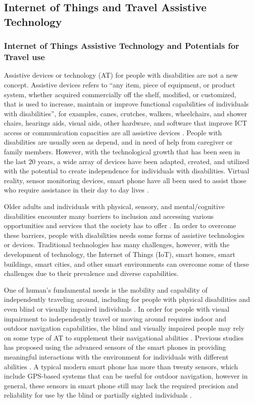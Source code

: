 \subsection{Internet of Things and Travel Assistive Technology}
\subsubsection{Internet of Things Assistive Technology and Potentials for Travel use}
Assistive devices or technology (AT) for people with disabilities are not a new concept. 
Assistive devices refers to ``any item, piece of equipment, or product system, 
whether acquired commercially off the shelf, modified, or customized, that is used 
to increase, maintain or improve functional capabilities of individuals with 
disabilities'', for examples, canes, crutches, walkers, wheelchairs, and shower 
chairs, hearings aids, visual aids, other hardware, and software that improve 
ICT access or communication capacities are all assistive devices \cite{Barbeau, Shah}. 
People with disabilities are usually seen as depend, and in need of help from
caregiver or family members. However, with the technological growth that has 
been seen in the last 20 years, a wide array of devices have been adapted, 
created, and utilized with the potential to create independence for individuals 
with disabilities. Virtual reality, sensor monitoring devices, smart phone have 
all been used to assist those who require assistance in their day to day 
lives \cite{moya2016dynamic}.  

Older adults and individuals with physical, sensory, and mental/cognitive 
disabilities encounter many barriers to inclusion and accessing various 
opportunities and services that the society has to offer \cite{Shah}. 
In order to overcome these barriers, people with disabilities needs some 
forms of assistive technologies or devices. Traditional technologies has 
many challenges, however,  with the development of technology, the 
Internet of Things (IoT), smart homes, smart buildings,
smart cities, and other smart environments can overcome some of 
these challenges due to their prevalence and diverse capabilities.

One of human's fundamental needs is the mobility and capability of 
independently traveling around, including for people with physical 
disabilities and even blind or visually impaired individuals \cite{Barbeau}.
In order for people with visual impairment to independently travel or 
moving around requires indoor and outdoor navigation capabilities, the 
blind and visually impaired people may rely on some type of AT to 
supplement their navigational abilities \cite{Shah}. Previous studies has 
proposed using the advanced sensors of the smart phones in providing 
meaningful interactions with the environment for individuals 
with different abilities \cite{Shah}. A typical modern smart phone 
has more than twenty sensors, which include GPS-based systems that 
can be useful for outdoor navigation, however in general, these 
sensors in smart phone still may lack the required precision 
and reliability for use by the blind or partially sighted individuals \cite{Shah}. 

